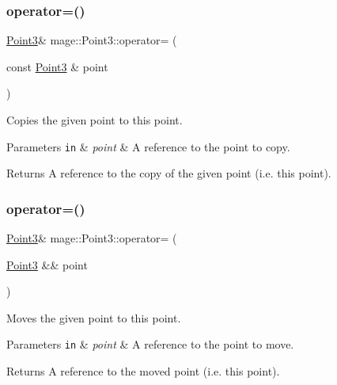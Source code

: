 \subsubsection{\texorpdfstring{operator=()}{operator=()}\hspace{0.1cm}{\footnotesize\ttfamily [1/2]}}
{\footnotesize\ttfamily \hyperlink{structmage_1_1_point3}{Point3}\& mage\+::\+Point3\+::operator= (\begin{DoxyParamCaption}\item[{const \hyperlink{structmage_1_1_point3}{Point3} \&}]{point }\end{DoxyParamCaption})}

Copies the given point to this point.


\begin{DoxyParams}[1]{Parameters}
\mbox{\tt in}  & {\em point} & A reference to the point to copy. \\
\hline
\end{DoxyParams}
\begin{DoxyReturn}{Returns}
A reference to the copy of the given point (i.\+e. this point). 
\end{DoxyReturn}
\hypertarget{structmage_1_1_point3_a6889dad6ac4106bd9a52fcae4dfa401c}{}\label{structmage_1_1_point3_a6889dad6ac4106bd9a52fcae4dfa401c} 
\subsubsection{\texorpdfstring{operator=()}{operator=()}\hspace{0.1cm}{\footnotesize\ttfamily [2/2]}}
{\footnotesize\ttfamily \hyperlink{structmage_1_1_point3}{Point3}\& mage\+::\+Point3\+::operator= (\begin{DoxyParamCaption}\item[{\hyperlink{structmage_1_1_point3}{Point3} \&\&}]{point }\end{DoxyParamCaption})}

Moves the given point to this point.


\begin{DoxyParams}[1]{Parameters}
\mbox{\tt in}  & {\em point} & A reference to the point to move. \\
\hline
\end{DoxyParams}
\begin{DoxyReturn}{Returns}
A reference to the moved point (i.\+e. this point). 
\end{DoxyReturn}
